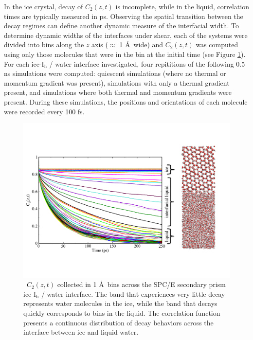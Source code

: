 In the ice crystal, decay of $C_2(z,t)$ is incomplete, while in the
liquid, correlation times are typically measured in ps. Observing the
spatial transition between the decay regimes can define another
dynamic measure of the interfacial width. To determine dynamic widths
of the interfaces under shear, each of the systems were divided into
bins along the $z$ axis ($\approx$ 1 \AA\ wide) and $C_2(z,t)$ was
computed using only those molecules that were in the bin at the
initial time (see Figure \ref{fig:Czt}). For each ice-I$_\mathrm{h}$ /
water interface investigated, four repititions of the following 0.5 ns
simulations were computed: quiescent simulations (where no thermal or
momentum gradient was present), simulations with only a thermal
gradient present, and simulations where both thermal and momentum
gradients were present. During these simulations, the positions and
orientations of each molecule were recorded every 100 fs.

\begin{figure}
\includegraphics[width=\linewidth]{Figures/CztImage}
\caption{\label{fig:Czt}~$C_2(z,t)$ collected in 1 \AA~bins across the SPC/E
  secondary prism ice-I$_\mathrm{h}$ / water interface. The band that experiences very
  little decay represents water molecules in the ice, while the band
  that decays quickly corresponds to bins in the liquid.  The
  correlation function presents a continuous distribution of decay
  behaviors across the interface between ice and liquid water.}
\end{figure}

